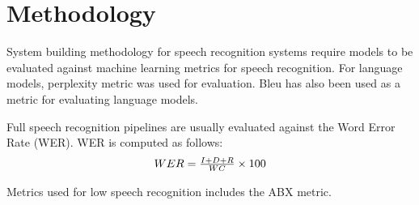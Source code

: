 \section{Methodology}
System building methodology \cite{nunamaker1990systems} for speech recognition systems require models to be evaluated against machine learning metrics for speech recognition.  For language models, perplexity metric was used for evaluation.  Bleu has also been used as a metric for evaluating language models.

Full speech recognition pipelines are usually evaluated against the Word Error Rate (WER).  WER is computed as follows:
\begin{equation}\label{eqn_2_3_wer}
$$WER=\frac{I+D+R}{WC}\times 100$$
\end{equation}

Metrics used for low speech recognition includes the ABX metric.